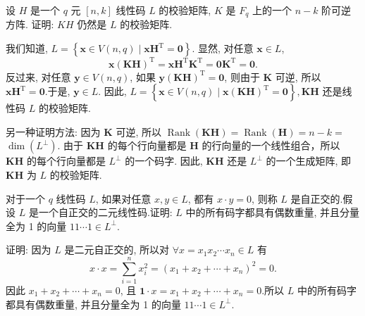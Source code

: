 \begin{exercise}
设 $ H $ 是一个 $ q $ 元 $ [n, k] $ 线性码 $ L $ 的校验矩阵, $ K $ 是 $ F_{q} $ 上的一个 $ n-k $ 阶可逆方阵. 证明: $ K H $ 仍然是 $ L $ 的校验矩阵.
\end{exercise}
\begin{solution}
 我们知道, $ L=\left\{\boldsymbol{x} \in V(n, q) \mid \boldsymbol{x} \boldsymbol{H}^{\mathrm{T}}=\mathbf{0}\right\} $. 显然, 对任意 $ \boldsymbol{x} \in L $,
$$
\boldsymbol{x}(\boldsymbol{K} \boldsymbol{H})^{\mathrm{T}}=\boldsymbol{x} \boldsymbol{H}^{\mathrm{T}} \boldsymbol{K}^{\mathrm{T}}=\mathbf{0} \boldsymbol{K}^{\mathrm{T}}=\mathbf{0} .
$$
反过来, 对任意 $ \boldsymbol{y} \in V(n, q) $, 如果 $ \boldsymbol{y}(\boldsymbol{K} \boldsymbol{H})^{\mathrm{T}}=\mathbf{0} $, 则由于 $ \boldsymbol{K} $ 可逆, 所以 $ \boldsymbol{x} \boldsymbol{H}^{\mathrm{T}}=\mathbf{0} $.于是, $ \boldsymbol{y} \in L $. 因此, $ L=\left\{\boldsymbol{x} \in V(n, q) \mid \boldsymbol{x}(\boldsymbol{K} \boldsymbol{H})^{\mathrm{T}}=\mathbf{0}\right\}, \boldsymbol{K} \boldsymbol{H} $ 还是线性码 $ L $ 的校验矩阵.

另一种证明方法: 因为 $ \boldsymbol{K} $ 可逆, 所以 $ \operatorname{Rank}(\boldsymbol{K} \boldsymbol{H})=\operatorname{Rank}(\boldsymbol{H})=n-k= $ $ \operatorname{dim}\left(L^{\perp}\right) $. 由于 $ \boldsymbol{K} \boldsymbol{H} $ 的每个行向量都是 $ \boldsymbol{H} $ 的行向量的一个线性组合，所以 $ \boldsymbol{K} \boldsymbol{H} $ 的每个行向量都是 $ L^{\perp} $ 的一个码字. 因此, $ \boldsymbol{K} \boldsymbol{H} $ 还是 $ L^{\perp} $ 的一个生成矩阵, 即 $ \boldsymbol{K} \boldsymbol{H} $ 为 $ L $ 的校验矩阵.

\end{solution}



\begin{exercise}
   对于一个 $ q $ 线性码 $ L $, 如果对任意 $ x, y \in L $, 都有 $ x \cdot y=0 $, 则称 $ L $ 是自正交的.假设 $ L $ 是一个自正交的二元线性码.证明: $ L $ 中的所有码字都具有偶数重量, 并且分量全为 1 的向量 $ 11 \cdots 1 \in L^{\perp} $.
\end{exercise}
\begin{solution}
    证明: 因为 $ L $ 是二元自正交的, 所以对 $ \forall x=x_{1} x_{2} \cdots x_{n} \in L $ 有
$$
x \cdot x=\sum_{i=1}^{n} x_{i}^{2}=\left(x_{1}+x_{2}+\cdots+x_{n}\right)^{2}=0 .
$$
因此 $ x_{1}+x_{2}+\cdots+x_{n}=0 $, 且 $ \boldsymbol{1} \cdot x=x_{1}+x_{2}+\cdots+x_{n}=0 $.所以 $ L $ 中的所有码字都具有偶数重量, 并且分量全为 1 的向量 $ 11 \cdots 1 \in L^{\perp} $.
\end{solution}



